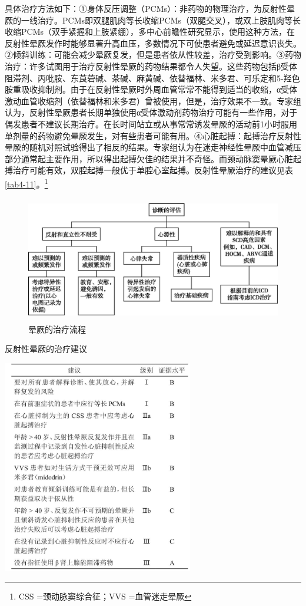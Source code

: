 具体治疗方法如下：①身体反压调整（PCMs）：非药物的物理治疗，为反射性晕厥的一线治疗。PCMs即双腿肌肉等长收缩PCMs（双腿交叉），或双上肢肌肉等长收缩PCMs（双手紧握和上肢紧绷），多中心前瞻性研究显示，使用这种方法，在反射性晕厥发作时能够显著升高血压，多数情况下可使患者避免或延迟意识丧失。②倾斜训练：可能会减少晕厥复发，但是患者依从性较差，治疗受到影响。③药物治疗：许多试图用于治疗反射性晕厥的药物结果都令人失望。这些药物包括β受体阻滞剂、丙吡胺、东莨菪碱、茶碱、麻黄碱、依替福林、米多君、可乐定和5-羟色胺重吸收抑制剂。由于在反射性晕厥时外周血管常常不能得到适当的收缩，α受体激动血管收缩剂（依替福林和米多君）曾被使用，但是，治疗效果不一致。专家组认为，反射性晕厥患者长期单独使用α受体激动剂药物治疗可能有一些作用，对于偶发患者不建议长期治疗。在长时间站立或从事常常诱发晕厥的活动前1小时服用单剂量的药物避免晕厥发生，对有些患者可能有用。④心脏起搏：起搏治疗反射性晕厥的随机对照试验得出了相反的结果。专家组认为在迷走神经性晕厥中血管减压部分通常起主要作用，所以得出起搏欠佳的结果并不奇怪。而颈动脉窦晕厥心脏起搏治疗可能有效，双腔起搏一般优于单腔心室起搏。反射性晕厥治疗的建议见表\ref{tab4-11}。\footnote{CSS =颈动脉窦综合征；VVS =血管迷走晕厥}

\begin{figure}[!htbp]
 \centering
 \includegraphics[width=4.82292in,height=2.16667in]{./images/Image00028.jpg}
 \captionsetup{justification=centering}
 \caption{晕厥的治疗流程}
 \label{fig4-2}
  \end{figure} 

\begin{table}[htbp]
\centering
\caption{反射性晕厥的治疗建议}
\label{tab4-11}
\includegraphics[width=3.28125in,height=3.66667in]{./images/Image00029.jpg}
\end{table}


